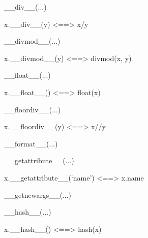 \documentclass[letterpaper,10pt,english]{sphinxmanual}
\begin{document}
\begin{description}
\begin{description}
\begin{DUlineblock}{0em}
\begin{DUlineblock}{\DUlineblockindent}
\end{DUlineblock}
\item[] \_\_div\_\_(...)
\item[]
\begin{DUlineblock}{\DUlineblockindent}
\item[] x.\_\_div\_\_(y) \textless{}==\textgreater{} x/y
\item[] 
\end{DUlineblock}
\item[] \_\_divmod\_\_(...)
\item[]
\begin{DUlineblock}{\DUlineblockindent}
\item[] x.\_\_divmod\_\_(y) \textless{}==\textgreater{} divmod(x, y)
\item[] 
\end{DUlineblock}
\item[] \_\_float\_\_(...)
\item[]
\begin{DUlineblock}{\DUlineblockindent}
\item[] x.\_\_float\_\_() \textless{}==\textgreater{} float(x)
\item[] 
\end{DUlineblock}
\item[] \_\_floordiv\_\_(...)
\item[]
\begin{DUlineblock}{\DUlineblockindent}
\item[] x.\_\_floordiv\_\_(y) \textless{}==\textgreater{} x//y
\item[] 
\end{DUlineblock}
\item[] \_\_format\_\_(...)
\item[] 
\item[] \_\_getattribute\_\_(...)
\item[]
\begin{DUlineblock}{\DUlineblockindent}
\item[] x.\_\_getattribute\_\_(`name') \textless{}==\textgreater{} x.name
\item[] 
\end{DUlineblock}
\item[] \_\_getnewargs\_\_(...)
\item[] 
\item[] \_\_hash\_\_(...)
\item[]
\begin{DUlineblock}{\DUlineblockindent}
\item[] x.\_\_hash\_\_() \textless{}==\textgreater{} hash(x)

\end{DUlineblock}
\end{DUlineblock}
\end{description}
\end{description}
\end{document}
